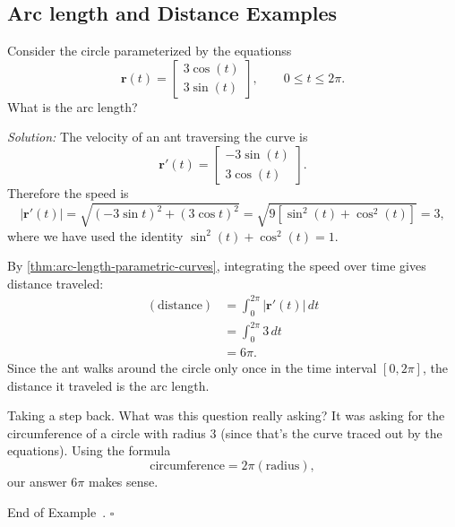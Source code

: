 \documentclass[10pt]{article}
\theoremstyle{definition}
\newtheorem{example}[theorem]{Example}
\renewenvironment{example}
{\begin{oldexample}}
  {\par\smallskip\hfill   End of Example~\theexample. $\square$    \par\end{oldexample}}
\newcommand{\1}[1]{\textbf{1}_{\left[#1\right]}} %
\begin{document}
\subsection{Arc length and Distance Examples}
\begin{example}[Arc length of a circle]
  \label{ex:arc-length-circle}

  Consider the circle parameterized by the equationss
  \begin{equation*}
    \mathbf{r}(t) =
    \begin{bmatrix}
      3\cos(t)\\
      3\sin(t)
    \end{bmatrix}, \qquad 0 \leq t \leq 2\pi.
  \end{equation*}
  What is the arc length?

  \textit{Solution:} The velocity of an ant traversing the curve is
  \begin{equation*}
    \mathbf{r}'(t) =
    \begin{bmatrix}
      -3\sin(t)\\3\cos(t)
    \end{bmatrix}.
  \end{equation*}
  Therefore the speed is
  \begin{equation*}
    |\mathbf{r}'(t)| = \sqrt{(-3\sin t)^{2}+(3\cos t)^{2}} = \sqrt{9[\sin^{2}(t)+\cos^{2}(t)]} = 3,
  \end{equation*}
  where we have used the identity $\sin^{2}(t)+\cos^{2}(t) =1$.

  By \cref{thm:arc-length-parametric-curves}, integrating the speed over time
  gives distance traveled:
  \begin{align*}
    (\text{distance})
    &= \int_{0}^{2\pi}|\mathbf{r}'(t)|\,dt\\ 
    &= \int_{0}^{2\pi}3\,dt\\ 
    &=6\pi.
  \end{align*}
  Since the ant walks around the circle only once in the time interval
  $[0,2\pi]$, the distance it traveled is the arc length.
  
  Taking a step back. What was this question really asking? It was asking for
  the circumference of a circle with radius $3$ (since that's the curve
  traced out by the equations). Using the formula
  \begin{equation*}
    \text{circumference} = 2\pi (\text{radius}),
  \end{equation*}
  our answer $6\pi$ makes sense.
\end{example}
\end{document}
